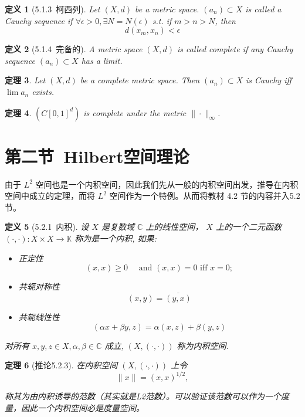 \documentclass[10pt,openany]{book}
\theoremstyle{thmstyle} %
\newtheorem{theorem}{定理}[chapter]
\theoremstyle{defstyle} %
\newtheorem{definition}[theorem]{定义}
\theoremstyle{prostyle} %
\begin{document}
\begin{definition}[5.1.3~柯西列] 
Let $(X, d)$ be a metric space. $\left(a_n\right) \subset X$ is called a Cauchy sequence if $\forall \epsilon>0, \exists N=N(\epsilon)$ s.t. if $m>n>N$, then
$$
d\left(x_m, x_n\right)<\epsilon
$$
\end{definition}

\begin{definition}[5.1.4~完备的] 
A metric space $(X, d)$ is called complete if any Cauchy sequence $\left(a_n\right) \subset X$ has a limit.
\end{definition}


\begin{theorem}
Let $(X, d)$ be a complete metric space. Then $\left(a_n\right) \subset X$ is Cauchy iff $\lim a_n$ exists.
\end{theorem}


\begin{theorem}
$\left(C[0,1]^d\right)$ is complete under the metric $\|\cdot\|_{\infty}$.
\end{theorem}



\section{第二节~Hilbert空间理论}

由于 $L^2$ 空间也是一个内积空间，因此我们先从一般的内积空间出发，推导在内积空间中成立的定理，而将 $L^2$ 空间作为一个特例。从而将教材 4.2 节的内容并入5.2节。

\begin{definition}[5.2.1~内积] 
设 $X$ 是复数域 $\mathbb{C}$ 上的线性空间， $X$ 上的一个二元函数 $(\cdot,\cdot): X \times X \rightarrow \mathbb{K}$ 称为是一个内积, 如果:
\begin{itemize}
  \item 正定性
  $$
  (x, x) \geq 0 \quad \text { and } (x, x)=0 \text { iff } x=0 ;
  $$
  \item 共轭对称性
  $$
  (x, y)=\overline{(y, x)}
  $$
  \item 共轭线性性
  $$
  (\alpha x + \beta y, z) = \alpha(x,z) + \beta(y,z)
  $$
\end{itemize}

对所有 $x, y, z \in X, \alpha, \beta \in \mathbb{C}$ 成立, $(X, (\cdot,\cdot))$ 称为内积空间.
\end{definition}

\begin{theorem}[推论5.2.3]
在内积空间 $(X,(\cdot, \cdot))$ 上令
$$
\|x\|=(x, x)^{1 / 2},
$$

称其为由内积诱导的范数（其实就是L2范数）。可以验证该范数可以作为一个度量，因此一个内积空间必是度量空间。
\end{theorem}
\end{document}
